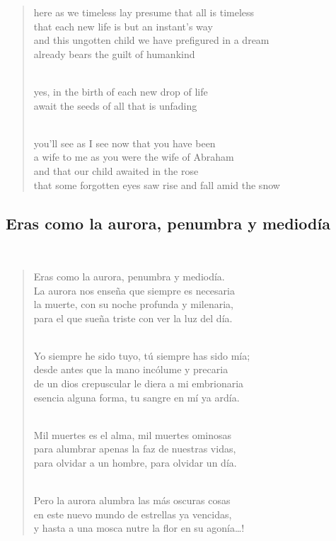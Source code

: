 \documentclass[a4paper, 12pt]{article}
\begin{document}
\begin{verse}
    
here as we timeless lay presume that all is timeless\\
that each new life is but an instant’s way\\
and this ungotten child we have prefigured in a dream\\
already bears the guilt of humankind\\
~ 

yes, in the birth of each new drop of life\\
await the seeds of all that is unfading\\
~ 

you’ll see as I see now that you have been\\
a wife to me as you were the wife of Abraham\\
and that our child awaited in the rose\\
that some forgotten eyes saw rise and fall amid the snow\\
\end{verse}

\pagebreak
\subsection{Eras como la aurora, penumbra y mediodía}
~ 

\begin{verse}
    
Eras como la aurora, penumbra y mediodía.\\
La aurora nos enseña que siempre es necesaria\\
la muerte, con su noche profunda y milenaria,\\
para el que sueña triste con ver la luz del día.\\
~ 

Yo siempre he sido tuyo, tú siempre has sido mía;\\
desde antes que la mano incólume y precaria\\
de un dios crepuscular le diera a mi embrionaria\\
esencia alguna forma, tu sangre en mí ya ardía.\\
~ 

Mil muertes es el alma, mil muertes ominosas\\
para alumbrar apenas la faz de nuestras vidas,\\
para olvidar a un hombre, para olvidar un día.\\
~ 

Pero la aurora alumbra las más oscuras cosas\\
en este nuevo mundo de estrellas ya vencidas,\\
y hasta a una mosca nutre la flor en su agonía…!\\
\end{verse}
\end{document}
